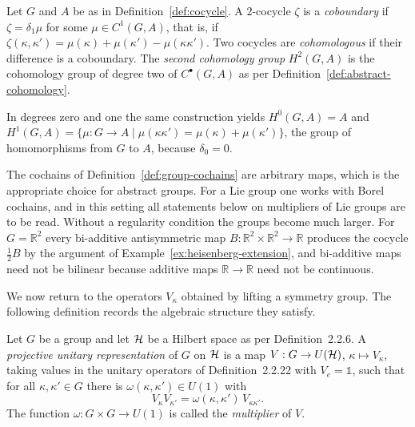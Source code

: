 \begin{definition}\label{def:cohomology-group}
	Let $G$ and $A$ be as in Definition~\ref{def:cocycle}. A $2$-cocycle $\zeta$ is a \emph{coboundary} if $\zeta=\delta_1\mu$ for some $\mu\in C^1(G,A)$, that is, if $\zeta(\kappa,\kappa')=\mu(\kappa)+\mu(\kappa')-\mu(\kappa\kappa')$. Two cocycles are \emph{cohomologous} if their difference is a coboundary. The \emph{second cohomology group} $H^2(G,A)$ is the cohomology group of degree two of $C^\bullet(G,A)$ as per Definition~\ref{def:abstract-cohomology}.
\end{definition}

\noindent In degrees zero and one the same construction yields $H^0(G,A)=A$ and $H^1(G,A)=\{\mu:G\to A\mid\mu(\kappa\kappa')=\mu(\kappa)+\mu(\kappa')\}$, the group of homomorphisms from $G$ to $A$, because $\delta_0=0$.

\begin{remark}\label{rem:topological-groups}
	The cochains of Definition~\ref{def:group-cochains} are arbitrary maps, which is the appropriate choice for abstract groups. For a Lie group one works with Borel cochains, and in this setting all statements below on multipliers of Lie groups are to be read. Without a regularity condition the groups become much larger. For $G=\mathbb{R}^2$ every bi-additive antisymmetric map $B:\mathbb{R}^2\times\mathbb{R}^2\to\mathbb{R}$ produces the cocycle $\frac12B$ by the argument of Example~\ref{ex:heisenberg-extension}, and bi-additive maps need not be bilinear because additive maps $\mathbb{R}\to\mathbb{R}$ need not be continuous.
\end{remark}

We now return to the operators $V_\kappa$ obtained by lifting a symmetry group. The following definition records the algebraic structure they satisfy.

\begin{definition}\label{def:projective-representation}
	Let $G$ be a group and let $\H$ be a Hilbert space as per Definition~2.2.6. A \emph{projective unitary representation} of $G$ on $\H$ is a map $V:G\to U(\H)$, $\kappa\mapsto V_\kappa$, taking values in the unitary operators of Definition~2.2.22 with $V_e=\mathbb{1}$, such that for all $\kappa,\kappa'\in G$ there is $\omega(\kappa,\kappa')\in U(1)$ with
	\begin{equation*}
		V_\kappa V_{\kappa'}=\omega(\kappa,\kappa')\,V_{\kappa\kappa'}.
	\end{equation*}
	The function $\omega:G\times G\to U(1)$ is called the \emph{multiplier} of $V$.
\end{definition}

